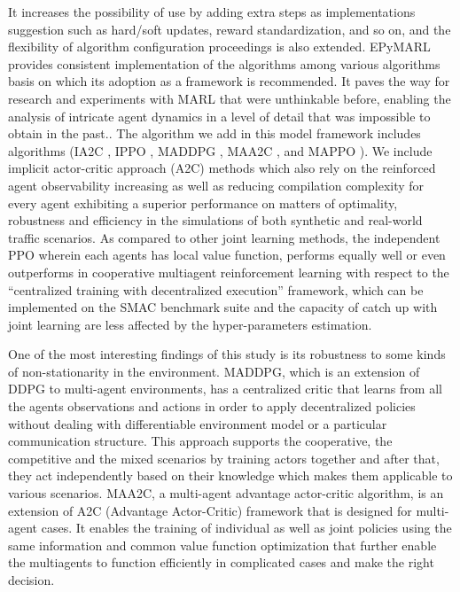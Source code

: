 \documentclass[11pt]{article}
\begin{document}
It increases the possibility of use by adding extra steps as implementations suggestion such as hard/soft updates, reward standardization, and so on, and the flexibility of algorithm configuration proceedings is also extended. EPyMARL provides consistent implementation of the algorithms among various algorithms basis on which its adoption as a framework is recommended. It paves the way for research and experiments with MARL that were unthinkable before, enabling the analysis of intricate agent dynamics in a level of detail that was impossible to obtain in the past.\cite{christianos2022pareto}. The algorithm we add in this model framework includes algorithms (IA2C \cite{Chu2019multi}, IPPO \cite{de2020independent}, MADDPG \cite{lowe2017multi}, MAA2C \cite{Iqbal2019actor}, and MAPPO \cite{Lohse2021implementing}). We include implicit actor-critic approach (A2C) methods which also rely on the reinforced agent observability increasing as well as reducing compilation complexity for every agent exhibiting a superior performance on matters of optimality, robustness and efficiency in the simulations of both synthetic and real-world traffic scenarios. As compared to other joint learning methods, the independent PPO wherein each agents has local value function, performs equally well or even outperforms in cooperative multiagent reinforcement learning with respect to the “centralized training with decentralized execution” framework, which can be implemented on the SMAC benchmark suite and the capacity of catch up with joint learning are less affected by the hyper-parameters estimation.

One of the most interesting findings of this study is its robustness to some kinds of non-stationarity in the environment. MADDPG, which is an extension of DDPG to multi-agent environments, has a centralized critic that learns from all the agents observations and actions in order to apply decentralized policies without dealing with differentiable environment model or a particular communication structure. This approach supports the cooperative, the competitive and the mixed scenarios by training actors together and after that, they act independently based on their knowledge which makes them applicable to various scenarios. MAA2C, a multi-agent advantage actor-critic algorithm, is an extension of A2C (Advantage Actor-Critic) framework that is designed for multi-agent cases. It enables the training of individual as well as joint policies using the same information and common value function optimization that further enable the multiagents to function efficiently in complicated cases and make the right decision.
\end{document}
